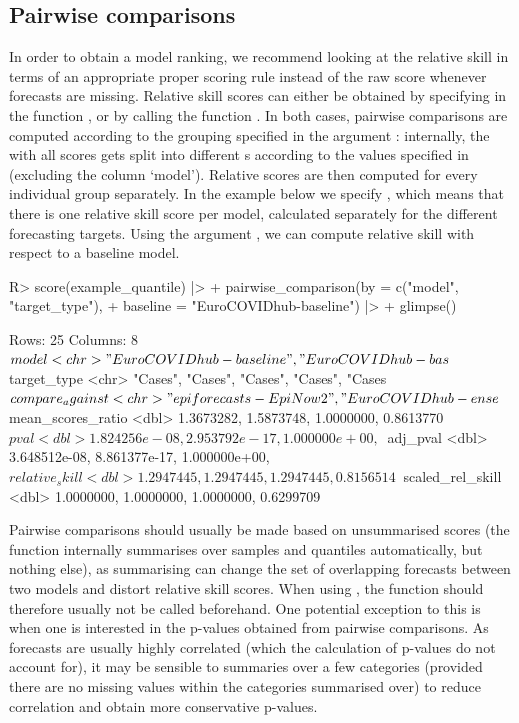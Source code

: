 \documentclass[
]{jss}
\begin{document}
\hypertarget{pairwisecode}{%
\subsection{Pairwise comparisons}\label{pairwisecode}}

In order to obtain a model ranking, we recommend looking at the relative
skill in terms of an appropriate proper scoring rule instead of the raw
score whenever forecasts are missing. Relative skill scores can either
be obtained by specifying  in the function
, or by calling the function
. In both cases, pairwise comparisons are
computed according to the grouping specified in the argument :
internally, the  with all scores gets split into
different s according to the values specified in
 (excluding the column `model'). Relative scores are then
computed for every individual group separately. In the example below we
specify , which means that there is
one relative skill score per model, calculated separately for the
different forecasting targets. Using the argument , we
can compute relative skill with respect to a baseline model.

\begin{CodeChunk}
\begin{CodeInput}
R> score(example_quantile) |>
+   pairwise_comparison(by = c("model", "target_type"),
+                       baseline = "EuroCOVIDhub-baseline") |>
+   glimpse()
\end{CodeInput}
\begin{CodeOutput}
Rows: 25
Columns: 8
$ model             <chr> "EuroCOVIDhub-baseline", "EuroCOVIDhub-bas~
$ target_type       <chr> "Cases", "Cases", "Cases", "Cases", "Cases~
$ compare_against   <chr> "epiforecasts-EpiNow2", "EuroCOVIDhub-ense~
$ mean_scores_ratio <dbl> 1.3673282, 1.5873748, 1.0000000, 0.8613770~
$ pval              <dbl> 1.824256e-08, 2.953792e-17, 1.000000e+00, ~
$ adj_pval          <dbl> 3.648512e-08, 8.861377e-17, 1.000000e+00, ~
$ relative_skill    <dbl> 1.2947445, 1.2947445, 1.2947445, 0.8156514~
$ scaled_rel_skill  <dbl> 1.0000000, 1.0000000, 1.0000000, 0.6299709~
\end{CodeOutput}
\end{CodeChunk}

Pairwise comparisons should usually be made based on unsummarised scores
(the function  internally summarises over
samples and quantiles automatically, but nothing else), as summarising
can change the set of overlapping forecasts between two models and
distort relative skill scores. When using ,
the function  should therefore usually not be
called beforehand. One potential exception to this is when one is
interested in the p-values obtained from pairwise comparisons. As
forecasts are usually highly correlated (which the calculation of
p-values do not account for), it may be sensible to summaries over a few
categories (provided there are no missing values within the categories
summarised over) to reduce correlation and obtain more conservative
p-values.
\end{document}
